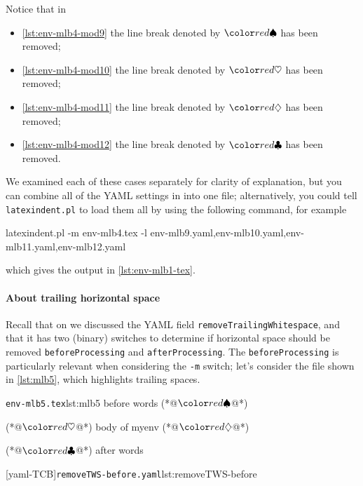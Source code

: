 Notice that in 
\begin{itemize}
  \item \cref{lst:env-mlb4-mod9} the line break denoted by $\BeginStartsOnOwnLine$ has been removed;
  \item \cref{lst:env-mlb4-mod10} the line break denoted by $\BodyStartsOnOwnLine$ has been removed;
  \item \cref{lst:env-mlb4-mod11} the line break denoted by $\EndStartsOnOwnLine$ has been removed;
  \item \cref{lst:env-mlb4-mod12} the line break denoted by $\EndFinishesWithLineBreak$ has been removed.
\end{itemize}
We examined each of these cases separately for clarity of explanation, but you can combine all of the YAML
settings in  into one file; alternatively, you could tell \texttt{latexindent.pl}
to load them all by using the following command, for example
\begin{sidebyside}
\begin{commandshell}
latexindent.pl -m env-mlb4.tex -l env-mlb9.yaml,env-mlb10.yaml,env-mlb11.yaml,env-mlb12.yaml
\end{commandshell}
\end{sidebyside}
which gives the output in \vref{lst:env-mlb1-tex}.

\paragraph{About trailing horizontal space}
Recall that on  we discussed the YAML field \texttt{removeTrailingWhitespace}, 
and that it has two (binary) switches to determine if horizontal space should be removed \texttt{beforeProcessing} and \texttt{afterProcessing}.
The \texttt{beforeProcessing} is particularly relevant when considering the \texttt{-m} switch; let's consider the 
file shown in \cref{lst:mlb5}, which highlights trailing spaces.

\begin{minipage}{.45\linewidth}
\begin{cmhlistings}[showspaces=true,escapeinside={(*@}{@*)}]{\texttt{env-mlb5.tex}}{lst:mlb5}
before words   (*@$\BeginStartsOnOwnLine$@*) 
\begin{myenv}           (*@$\BodyStartsOnOwnLine$@*)
body of myenv      (*@$\EndStartsOnOwnLine$@*) 
\end{myenv}     (*@$\EndFinishesWithLineBreak$@*)
after words
\end{cmhlistings}
\end{minipage}
\hfill
\begin{minipage}{.45\linewidth}
[yaml-TCB]{\texttt{removeTWS-before.yaml}}{lst:removeTWS-before}
\end{minipage}

